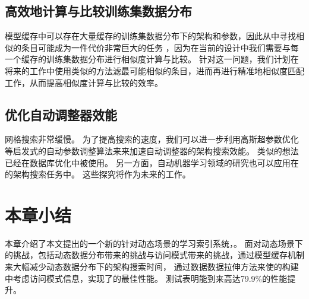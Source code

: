 
\subsection{高效地计算与比较训练集数据分布}
模型缓存中可以存在大量缓存的训练集数据分布下的{\rmi}架构和参数，因此从中寻找相似的条目可能成为一件代价非常巨大的任务
，因为在当前的设计中我们需要与每一个缓存的训练集数据分布进行相似度计算与比较。
针对这一问题，我们计划在将来的工作中使用类似\cite{metwally2005efficient, ilyas2008survey}的方法滤最可能相似的条目，进而再进行精准地相似度匹配工作，从而提高相似度计算与比较的效率。


\subsection{优化自动调整器效能}
网格搜索非常缓慢。
为了提高搜索的速度，我们可以进一步利用高斯超参数优化\cite{snoek2012practical, bergstra2011algorithms, brochu2010tutorial}等启发式的自动参数调整算法来来加速自动调整器的架构搜索效能。
类似的想法已经在数据库优化中被使用\cite{duan2009tuning, thummala2010ituned}。
另一方面，自动机器学习领域的研究也可以应用在{\rmi}的架构搜索任务中。
这些探究将作为未来的工作。


\section{本章小结}
本章介绍了本文提出的一个新的针对动态场景的学习索引系统，{\sys}。
{\sys}面对动态场景下的挑战，包括动态数据分布带来的挑战与访问模式带来的挑战，通过模型缓存机制来大幅减少动态数据分布下的{\rmi}架构搜索时间，
通过数据数据拉伸方法来使{\li}的构建中考虑访问模式信息，实现了{\li}的最佳性能。
测试表明{\sys}能到来高达79.9\%的性能提升。
